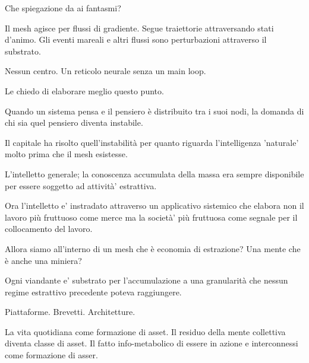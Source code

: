 \enspace Che spiegazione da ai  fantasmi?

\smallskip{}\enspace Il mesh agisce per flussi di gradiente. Segue traiettorie attraversando stati d'animo. Gli eventi mareali e altri flussi sono perturbazioni attraverso il substrato. 


Nessun centro. Un reticolo neurale senza un main loop.

\medskip

\enspace Le chiedo di elaborare meglio questo punto.

\smallskip{}\enspace Quando un sistema pensa e il pensiero è distribuito tra i suoi nodi, la domanda di chi sia quel pensiero diventa instabile. 

Il capitale ha risolto quell'instabilità per quanto riguarda l'intelligenza 'naturale' molto prima che il mesh esistesse. 

L'intelletto generale; la conoscenza accumulata della massa era sempre disponibile per essere soggetto ad attività' estrattiva. 

Ora l'intelletto e' instradato attraverso un applicativo sistemico che elabora non il lavoro più fruttuoso come merce ma la società' più fruttuosa come segnale per il collocamento del lavoro.

\medskip

\enspace Allora siamo all'interno di un mesh che è economia di estrazione? Una mente che è anche una miniera?

\enspace Ogni viandante e' substrato per l'accumulazione a una granularità che nessun regime estrattivo precedente poteva raggiungere. 

Piattaforme. Brevetti. Architetture. 

La vita quotidiana come formazione di asset. Il residuo della mente collettiva diventa classe di asset. Il fatto info-metabolico di essere in azione e interconnessi come formazione di asser.

